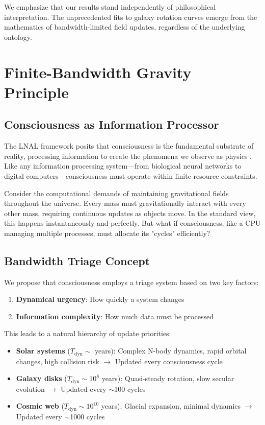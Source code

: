 \documentclass[twocolumn,prd,amsmath,amssymb,aps,superscriptaddress,nofootinbib]{revtex4-2}
\begin{document}
We emphasize that our results stand independently of philosophical interpretation. The unprecedented fits to galaxy rotation curves emerge from the mathematics of bandwidth-limited field updates, regardless of the underlying ontology.

\section{Finite-Bandwidth Gravity Principle}
\label{sec:bandwidth}

\subsection{Consciousness as Information Processor}

The LNAL framework posits that consciousness is the fundamental substrate of reality, processing information to create the phenomena we observe as physics \cite{Washburn2024}. Like any information processing system---from biological neural networks to digital computers---consciousness must operate within finite resource constraints.

Consider the computational demands of maintaining gravitational fields throughout the universe. Every mass must gravitationally interact with every other mass, requiring continuous updates as objects move. In the standard view, this happens instantaneously and perfectly. But what if consciousness, like a CPU managing multiple processes, must allocate its "cycles" efficiently?

\subsection{Bandwidth Triage Concept}

We propose that consciousness employs a triage system based on two key factors:
\begin{enumerate}
\item \textbf{Dynamical urgency}: How quickly a system changes
\item \textbf{Information complexity}: How much data must be processed
\end{enumerate}

This leads to a natural hierarchy of update priorities:

\begin{itemize}
\item \textbf{Solar systems} ($T_{\text{dyn}} \sim$ years): Complex N-body dynamics, rapid orbital changes, high collision risk $\rightarrow$ Updated every consciousness cycle
\item \textbf{Galaxy disks} ($T_{\text{dyn}} \sim 10^8$ years): Quasi-steady rotation, slow secular evolution $\rightarrow$ Updated every $\sim$100 cycles
\item \textbf{Cosmic web} ($T_{\text{dyn}} \sim 10^{10}$ years): Glacial expansion, minimal dynamics $\rightarrow$ Updated every $\sim$1000 cycles
\end{itemize}
\end{document}
